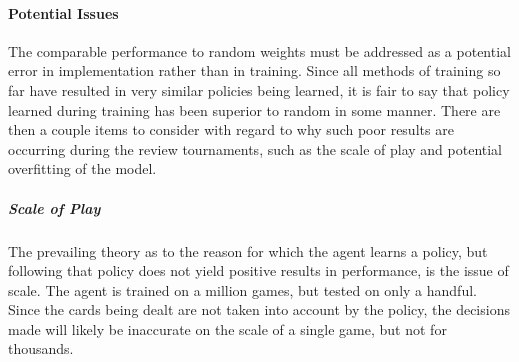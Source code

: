 
\paragraph*{Potential Issues}
\label{sec:findings-r2-potentialissues}

The comparable performance to random weights must be addressed as a potential
error in implementation rather than in training.
%
Since all methods of training so far have resulted in very similar policies
being learned,
it is fair to say that policy learned during training has been superior to
random in some manner.
%
There are then a couple items to consider with regard to why such poor results are occurring
during the review tournaments,
such as the scale of play and potential overfitting of the model.




\subparagraph*{Scale of Play}

The prevailing theory as to the reason for which the agent learns a policy,
but following that policy does not yield positive results in performance,
is the issue of scale.
%
The agent is trained on a million games,
but tested on only a handful.
%
Since the cards being dealt are not taken into account by the policy,
the decisions made will likely be inaccurate on the scale of a single game,
but not for thousands.




